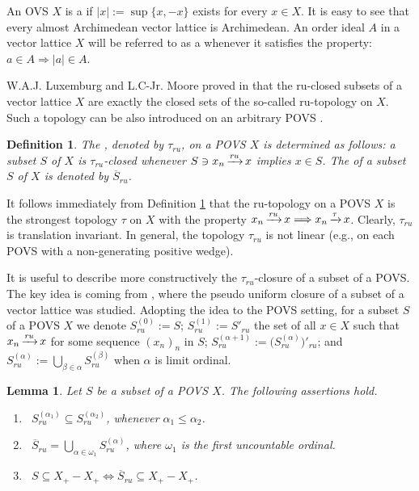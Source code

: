 \documentclass[10pt]{article}
\newtheorem{lemma}{Lemma}[section]
\newtheorem{definition}{Definition}[section]
\DeclareMathOperator{\convr}{\xrightarrow[]{{\it ru}}}
\DeclareMathOperator{\convtau}{\xrightarrow[]{\tau}}
\renewcommand{\a}{\alpha}
\renewcommand{\b}{\beta}
\newcommand{\w}{\omega}
\begin{document}
An OVS $X$ is a {\color{blue}{vector lattice}} if $|x|:=\sup\{x,-x\}$ exists for every $x\in X$. It is easy to see that
every almost Archimedean vector lattice is Archimedean. An order ideal $A$ in a vector lattice $X$ will be referred to as a {\color{blue}{lattice ideal}}
whenever it  satisfies the property: $a\in A\Longrightarrow|a|\in A$.

\smallskip
W.A.J. Luxemburg and L.C-Jr. Moore proved in \cite{LM-1967} that the ru-closed subsets of a vector lattice $X$ are exactly the closed sets 
of the so-called ru-topology on $X$. Such a topology can be also introduced on an arbitrary POVS \cite{KG-2019}.

\begin{definition}\label{Definition-2_1}
The {\color{blue}{ru-topology}}, denoted by $\tau_{ru}$, on a POVS $X$ is determined as follows: a subset $S$ of $X$
is $\tau_{ru}$-closed whenever $S\ni x_n\convr x$ implies $x\in S$. The {} of a subset $S$ of $X$ is denoted by $\overline{S}_{ru}$.
\end{definition}

It follows immediately from Definition \ref{Definition-2_1} that the ru-topology on a POVS $X$ is the strongest topology
$\tau$ on $X$ with the property $x_n\convr x\Longrightarrow x_n\convtau x$. Clearly, $\tau_{ru}$ is translation invariant.
In general, the topology $\tau_{ru}$ is not linear (e.g., on each POVS with a non-generating positive wedge).

It is useful to describe more constructi\-vely the $\tau_{ru}$-closure of a subset of a POVS.
The key idea is coming from \cite{LM-1967}, where the pseudo uniform closure of a subset of a vector lattice was studied.
Adopting the idea to the POVS setting, for a subset $S$ of a POVS $X$ we denote $S^{(0)}_{ru}:=S$;
$S^{(1)}_{ru}:=S'_{ru}$ the set of all $x\in X$ such that $x_n\convr x$ for some sequence $(x_n)_n$ in $S$;
$S^{({\a}+1)}_{ru}:=\bigl(S^{({\a})}_{ru}\bigl)'_{ru}$; and
$S^{({\a})}_{ru}:=\bigcup\limits_{\b\in{\a}}S^{(\b)}_{ru}$ when ${\a}$ is limit ordinal.

\begin{lemma}\label{Lemma-2_2}
Let $S$ be a subset of a POVS $X$. The following assertions hold.
\begin{enumerate}[$i)$]
\item\
$S^{({\a}_1)}_{ru}\subseteq S^{({\a}_2)}_{ru}$, whenever ${\a}_1\leqslant{\a}_2$.
\item\
$\overline{S}_{ru}=\bigcup\limits_{{\a}\in{\w}_1}S^{({\a})}_{ru}$, where ${\w}_1$ is the first uncountable ordinal.
\item\
$S\subseteq X_+-X_+\Longleftrightarrow\overline{S}_{ru}\subseteq X_+-X_+$.
\end{enumerate}
\end{lemma}
\end{document}

